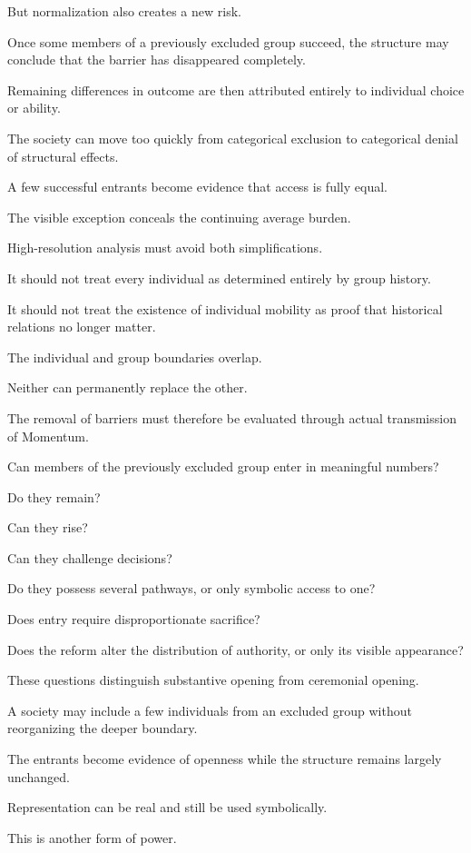 But normalization also creates a new risk.

Once some members of a previously excluded group succeed, the structure may conclude that the barrier has disappeared completely.

Remaining differences in outcome are then attributed entirely to individual choice or ability.

The society can move too quickly from categorical exclusion to categorical denial of structural effects.

A few successful entrants become evidence that access is fully equal.

The visible exception conceals the continuing average burden.

High-resolution analysis must avoid both simplifications.

It should not treat every individual as determined entirely by group history.

It should not treat the existence of individual mobility as proof that historical relations no longer matter.

The individual and group boundaries overlap.

Neither can permanently replace the other.

The removal of barriers must therefore be evaluated through actual transmission of Momentum.

Can members of the previously excluded group enter in meaningful numbers?

Do they remain?

Can they rise?

Can they challenge decisions?

Do they possess several pathways, or only symbolic access to one?

Does entry require disproportionate sacrifice?

Does the reform alter the distribution of authority, or only its visible appearance?

These questions distinguish substantive opening from ceremonial opening.

A society may include a few individuals from an excluded group without reorganizing the deeper boundary.

The entrants become evidence of openness while the structure remains largely unchanged.

Representation can be real and still be used symbolically.

This is another form of power.

